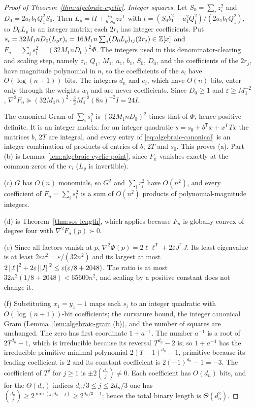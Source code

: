 \begin{proof}[Proof of Theorem~\ref{thm:algebraic-cyclic}]
\emph{Integer squares.} Let $S_0=\sum_iz_i^2$ and $D_0=2a_1b_1Q_1^2S_0$. Then
$L_\varrho=tI+\frac{a_1}{b_1S_0}zz^{\mathsf T}$ with
$t=(S_0b_1^2-a_1^2Q_1^2)/(2a_1b_1Q_1^2)$, so $D_0L_\varrho$ is an integer
matrix; each $2r_i$ has integer coefficients. Put
$s_i=32M_1nD_0(L_\varrho r)_i=16M_1n\sum_j(D_0L_\varrho)_{ij}(2r_j)\in\mathbb Z[x]$
and $F_n=\sum_is_i^2=(32M_1nD_0)^2\Phi$. The integers used in this
denominator-clearing and scaling step, namely $z_i$, $Q_1$, $M_1$, $a_1$,
$b_1$, $S_0$, $D_0$, and the coefficients of the $2r_j$, have magnitude
polynomial in $n$, so the coefficients of the $s_i$ have $O(\log(n+1))$
bits. The integers $d_n$ and $e_i$, which have $O(n)$ bits, enter only
through the weights $w_i$ and are never coefficients. Since $D_0\ge1$ and
$\varepsilon\ge M_1^{-2}$,
$\nabla^2F_n\succeq(32M_1n)^2\cdot\frac32M_1^{-2}(8n)^{-2}I=24I$.

The canonical Gram of $\sum_is_i^2$ is $(32M_1nD_0)^2$ times that of $\Phi$,
hence positive definite. It is an integer matrix: for an integer quadratic
$s=s_0+b^{\mathsf T}x+x^{\mathsf T}Tx$ the matrices $b$, $2T$ are integral, and
every entry of \eqref{eq:algebraic-canonical} is an integer combination of
products of entries of $b$, $2T$ and $s_0$. This proves (a). Part (b) is
Lemma~\ref{lem:algebraic-cyclic-point}, since $F_n$ vanishes exactly at the
common zeros of the $r_i$ ($L_\varrho$ is invertible).

(c) $G$ has $O(n)$ monomials, so $G^2$ and $\sum_ir_i^2$ have $O(n^2)$, and
every coefficient of $F_n=\sum_is_i^2$ is a sum of $O(n^2)$ products of
polynomial-magnitude integers.

(d) is Theorem~\ref{thm:sos-length}, which applies because $F_n$ is globally
convex of degree four with $\nabla^2F_n(p)\succ0$.

(e) Since all factors vanish at $p$,
$\nabla^2\Phi(p)=2\ell\ell^{\mathsf T}+2\varepsilon J^{\mathsf T}J$. Its least
eigenvalue is at least $2\varepsilon\nu^2=\varepsilon/(32n^2)$ and its
largest at most $2\left\lVert\ell\right\rVert^2+2\varepsilon\left\lVert J\right\rVert^2\le\varepsilon(\varepsilon/8
+2048)$. The ratio is at most $32n^2(1/8+2048)<65600n^2$, and scaling by a
positive constant does not change it.

(f) Substituting $x_1=y_1-1$ maps each $s_i$ to an integer quadratic with
$O(\log(n+1))$-bit coefficients; the curvature bound, the integer canonical
Gram (Lemma~\ref{lem:algebraic-gram}(b)), and the number of squares are
unchanged. The zero has first coordinate $1+a^{-1}$. The number $a^{-1}$ is a
root of $2T^{d_n}-1$, which is irreducible because its reversal $T^{d_n}-2$ is;
so $1+a^{-1}$ has the irreducible primitive minimal polynomial
$2(T-1)^{d_n}-1$, primitive because its leading coefficient is $2$ and its
constant coefficient is $2(-1)^{d_n}-1=-3$. The coefficient of $T^j$ for
$j\ge1$ is $\pm2\binom{d_n}j\ne0$. Each coefficient has $O(d_n)$ bits, and for
the $\Theta(d_n)$ indices $d_n/3\le j\le2d_n/3$ one has
$\binom{d_n}j\ge2^{\min(j,d_n-j)}\ge2^{d_n/3-1}$; hence the total binary length
is $\Theta(d_n^2)$.
\end{proof}

